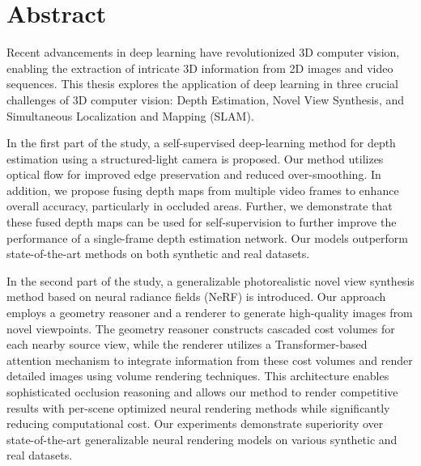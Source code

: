 

\cleardoublepage
\chapter*{Abstract}
Recent advancements in deep learning have revolutionized 3D computer vision, enabling the extraction of intricate 3D information from 2D images and video sequences. This thesis explores the application of deep learning in three crucial challenges of 3D computer vision: Depth Estimation, Novel View Synthesis, and Simultaneous Localization and Mapping (SLAM).

\vspace{2ex}
In the first part of the study, a self-supervised deep-learning method for depth estimation using a structured-light camera is proposed. Our method utilizes optical flow for improved edge preservation and reduced over-smoothing. In addition, we propose fusing depth maps from multiple video frames to enhance overall accuracy, particularly in occluded areas. Further, we demonstrate that these fused depth maps can be used for self-supervision to further improve the performance of a single-frame depth estimation network. Our models outperform state-of-the-art methods on both synthetic and real datasets.

\vspace{2ex}
In the second part of the study, a generalizable photorealistic novel view synthesis method based on neural radiance fields (NeRF) is introduced. Our approach employs a geometry reasoner and a renderer to generate high-quality images from novel viewpoints. The geometry reasoner constructs cascaded cost volumes for each nearby source view, while the renderer utilizes a Transformer-based attention mechanism to integrate information from these cost volumes and render detailed images using volume rendering techniques. This architecture enables sophisticated occlusion reasoning and allows our method to render competitive results with per-scene optimized neural rendering methods while significantly reducing computational cost. Our experiments demonstrate superiority over state-of-the-art generalizable neural rendering models on various synthetic and real datasets.

